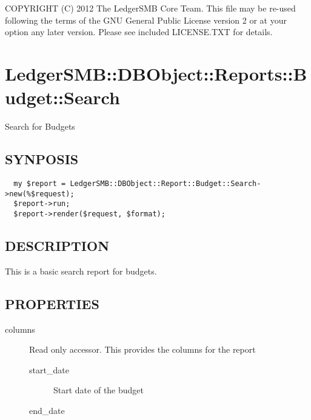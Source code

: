 \begin{description}
\begin{description}
\begin{description}
\begin{description}
\begin{description}
\begin{description}
\begin{description}
\begin{description}
\begin{description}
\begin{description}
COPYRIGHT (C) 2012 The LedgerSMB Core Team.  This file may be re-used following
the terms of the GNU General Public License version 2 or at your option any
later version.  Please see included LICENSE.TXT for details.

\section{LedgerSMB::DBObject::Reports::Budget::Search\label{LedgerSMB::DBObject::Reports::Budget::Search}}


Search for Budgets

\subsection*{SYNPOSIS\label{LedgerSMB::DBObject::Reports::Budget::Search_SYNPOSIS}}
\begin{verbatim}
  my $report = LedgerSMB::DBObject::Report::Budget::Search->new(%$request);
  $report->run;
  $report->render($request, $format);
\end{verbatim}
\subsection*{DESCRIPTION\label{LedgerSMB::DBObject::Reports::Budget::Search_DESCRIPTION}}


This is a basic search report for budgets.

\subsection*{PROPERTIES\label{LedgerSMB::DBObject::Reports::Budget::Search_PROPERTIES}}
\begin{description}

\item[{columns}] \mbox{}

Read only accessor.  This provides the columns for the report

\begin{description}

\item[{start\_date}] \mbox{}

Start date of the budget


\item[{end\_date}] \mbox{}


\end{description}
\end{description}
\end{description}
\end{description}
\end{description}
\end{description}
\end{description}
\end{description}
\end{description}
\end{description}
\end{description}
\end{description}
